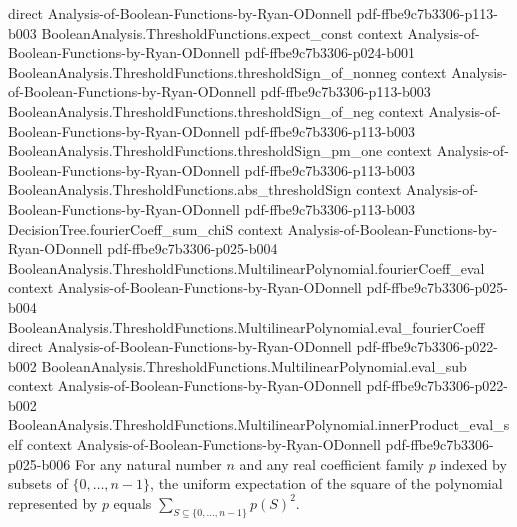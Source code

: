\begin{lemma}
  {direct}
  {Analysis-of-Boolean-Functions-by-Ryan-ODonnell}
  {pdf-ffbe9c7b3306-p113-b003}
\proofstep
  {BooleanAnalysis.ThresholdFunctions.expect_const}
  {context}
  {Analysis-of-Boolean-Functions-by-Ryan-ODonnell}
  {pdf-ffbe9c7b3306-p024-b001}
\proofstep
  {BooleanAnalysis.ThresholdFunctions.thresholdSign_of_nonneg}
  {context}
  {Analysis-of-Boolean-Functions-by-Ryan-ODonnell}
  {pdf-ffbe9c7b3306-p113-b003}
\proofstep
  {BooleanAnalysis.ThresholdFunctions.thresholdSign_of_neg}
  {context}
  {Analysis-of-Boolean-Functions-by-Ryan-ODonnell}
  {pdf-ffbe9c7b3306-p113-b003}
\proofstep
  {BooleanAnalysis.ThresholdFunctions.thresholdSign_pm_one}
  {context}
  {Analysis-of-Boolean-Functions-by-Ryan-ODonnell}
  {pdf-ffbe9c7b3306-p113-b003}
\proofstep
  {BooleanAnalysis.ThresholdFunctions.abs_thresholdSign}
  {context}
  {Analysis-of-Boolean-Functions-by-Ryan-ODonnell}
  {pdf-ffbe9c7b3306-p113-b003}
\proofstep
  {DecisionTree.fourierCoeff_sum_chiS}
  {context}
  {Analysis-of-Boolean-Functions-by-Ryan-ODonnell}
  {pdf-ffbe9c7b3306-p025-b004}
\proofstep
  {BooleanAnalysis.ThresholdFunctions.MultilinearPolynomial.fourierCoeff_eval}
  {context}
  {Analysis-of-Boolean-Functions-by-Ryan-ODonnell}
  {pdf-ffbe9c7b3306-p025-b004}
\proofstep
  {BooleanAnalysis.ThresholdFunctions.MultilinearPolynomial.eval_fourierCoeff}
  {direct}
  {Analysis-of-Boolean-Functions-by-Ryan-ODonnell}
  {pdf-ffbe9c7b3306-p022-b002}
\proofstep
  {BooleanAnalysis.ThresholdFunctions.MultilinearPolynomial.eval_sub}
  {context}
  {Analysis-of-Boolean-Functions-by-Ryan-ODonnell}
  {pdf-ffbe9c7b3306-p022-b002}
\proofstep
  {BooleanAnalysis.ThresholdFunctions.MultilinearPolynomial.innerProduct_eval_self}
  {context}
  {Analysis-of-Boolean-Functions-by-Ryan-ODonnell}
  {pdf-ffbe9c7b3306-p025-b006}
For any natural number $n$ and any real coefficient family $p$ indexed by subsets of
$\{0,\ldots,n-1\}$, the uniform expectation of the square of the polynomial represented
by $p$ equals $\sum_{S\subseteq\{0,\ldots,n-1\}}p(S)^2$.
\end{lemma}


